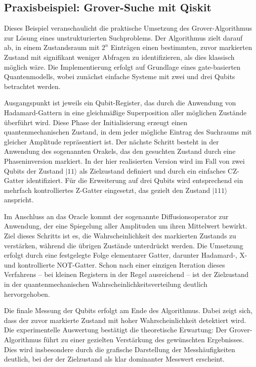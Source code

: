\subsection{Praxisbeispiel: Grover-Suche mit Qiskit} 
Dieses Beispiel veranschaulicht die praktische Umsetzung des Grover-Algorithmus zur Lösung eines unstrukturierten Suchproblems. Der Algorithmus zielt darauf ab, in einem Zustandsraum mit $2^n$ Einträgen einen bestimmten, zuvor markierten Zustand mit signifikant weniger Abfragen zu identifizieren, als dies klassisch möglich wäre. Die Implementierung erfolgt auf Grundlage eines gate-basierten Quantenmodells, wobei zunächst einfache Systeme mit zwei und drei Qubits betrachtet werden.

Ausgangspunkt ist jeweils ein Qubit-Register, das durch die Anwendung von Hadamard-Gattern in eine gleichmäßige Superposition aller möglichen Zustände überführt wird. Diese Phase der Initialisierung erzeugt einen quantenmechanischen Zustand, in dem jeder mögliche Eintrag des Suchraums mit gleicher Amplitude repräsentiert ist. Der nächste Schritt besteht in der Anwendung des sogenannten Orakels, das den gesuchten Zustand durch eine Phaseninversion markiert. In der hier realisierten Version wird im Fall von zwei Qubits der Zustand $|11\rangle$ als Zielzustand definiert und durch ein einfaches CZ-Gatter identifiziert. Für die Erweiterung auf drei Qubits wird entsprechend ein mehrfach kontrolliertes Z-Gatter eingesetzt, das gezielt den Zustand $|111\rangle$ anspricht.

Im Anschluss an das Oracle kommt der sogenannte Diffusionsoperator zur Anwendung, der eine Spiegelung aller Amplituden um ihren Mittelwert bewirkt. Ziel dieses Schritts ist es, die Wahrscheinlichkeit des markierten Zustands zu verstärken, während die übrigen Zustände unterdrückt werden. Die Umsetzung erfolgt durch eine festgelegte Folge elementarer Gatter, darunter Hadamard-, X- und kontrollierte NOT-Gatter. Schon nach einer einzigen Iteration dieses Verfahrens – bei kleinen Registern in der Regel ausreichend – ist der Zielzustand in der quantenmechanischen Wahrscheinlichkeitsverteilung deutlich hervorgehoben.

Die finale Messung der Qubits erfolgt am Ende des Algorithmus. Dabei zeigt sich, dass der zuvor markierte Zustand mit hoher Wahrscheinlichkeit detektiert wird. Die experimentelle Auswertung bestätigt die theoretische Erwartung: Der Grover-Algorithmus führt zu einer gezielten Verstärkung des gewünschten Ergebnisses. Dies wird insbesondere durch die grafische Darstellung der Messhäufigkeiten deutlich, bei der der Zielzustand als klar dominanter Messwert erscheint.

